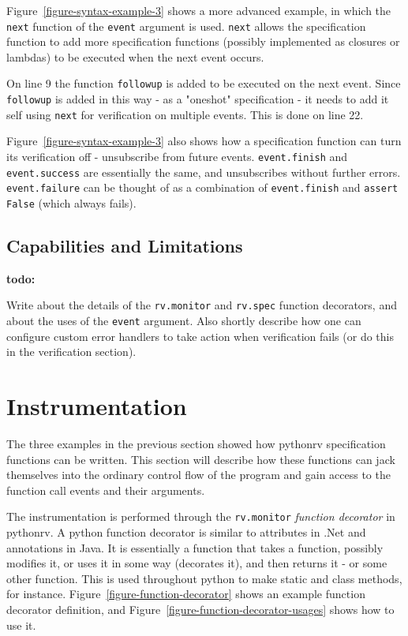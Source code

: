 \documentclass[a4paper,11pt]{kth-mag}
\newcommand{\todo}[1]{\textbf{todo: #1}}
\begin{document}
Figure~\ref{figure-syntax-example-3} shows a more advanced example, in which
the \texttt{next} function of the \texttt{event} argument is used.
\texttt{next} allows the specification function to add more specification
functions (possibly implemented as closures or lambdas) to be executed when the
next event occurs.

On line 9 the function \texttt{followup} is added to be executed on the next
event. Since \texttt{followup} is added in this way - as a "oneshot"
specification - it needs to add it self using \texttt{next} for verification on
multiple events. This is done on line 22.

Figure~\ref{figure-syntax-example-3} also shows how a specification function
can turn its verification off - unsubscribe from future events.
\texttt{event.finish} and \texttt{event.success} are essentially the same, and
unsubscribes without further errors. \texttt{event.failure} can be thought of
as a combination of \texttt{event.finish} and \texttt{assert False} (which
always fails).


\subsection{Capabilities and Limitations}

\todo{}

Write about the details of the \texttt{rv.monitor} and \texttt{rv.spec}
function decorators, and about the uses of the \texttt{event} argument. Also
shortly describe how one can configure custom error handlers to take action
when verification fails (or do this in the verification section).

\section{Instrumentation} \label{section-method-instrumentation}

The three examples in the previous section showed how pythonrv specification
functions can be written. This section will describe how these functions can
jack themselves into the ordinary control flow of the program and gain access
to the function call events and their arguments.

The instrumentation is performed through the \texttt{rv.monitor}
\textit{function decorator} in pythonrv. A python function decorator is similar
to attributes in .Net and annotations in Java. It is essentially a function
that takes a function, possibly modifies it, or uses it in some way (decorates
it), and then returns it - or some other function. This is used throughout
python to make static and class methods, for instance.
Figure~\ref{figure-function-decorator} shows an example function decorator
definition, and Figure~\ref{figure-function-decorator-usages} shows how to use
it.
\end{document}
